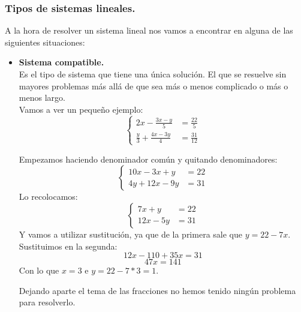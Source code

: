 \documentclass[a4paper,11pt,answers]{exam}
\begin{document}
\subsubsection{Tipos de sistemas lineales.}\label{tipos_sistemas_lineales}
A la hora de resolver un sistema lineal nos vamos a encontrar en alguna de las siguientes
situaciones:
\begin{itemize}
\item \large{\textbf{Sistema compatible.}}\\
  Es el tipo de sistema que tiene una única solución. El que se resuelve sin mayores problemas más
  allá de que sea más o menos complicado o más o menos largo.\\
  Vamos a ver un pequeño ejemplo:
  \[
    \begin{cases}
      2x - \frac{3x-y}{5}& = \frac{22}{5}\\[10pt]
      \frac{y}{3} + \frac{4x-3y}{4}& = \frac{31}{12}
    \end{cases}\]
  \begin{solution}
    Empezamos haciendo denominador común y quitando denominadores:
    \[
      \begin{cases}
        10x - 3x+y& = 22\\
        4y + 12x-9y& = 31
      \end{cases}\]
    Lo recolocamos:
    \[
      \begin{cases}
        7x + y &=22\\
        12x - 5y &= 31
      \end{cases}\]
    Y vamos a utilizar sustitución, ya que de la primera sale que $y = 22-7x$. Sustituimos
    en la segunda:
    \[12x - 110 + 35x = 31\]
    \[47x = 141\]
    Con lo que $x=3$ e $y = 22 - 7*3 = 1$.
  \end{solution}
  Dejando aparte el tema de las fracciones no hemos tenido ningún problema para resolverlo.\\


\end{itemize}
\end{document}
